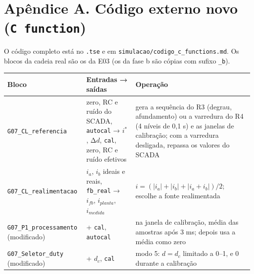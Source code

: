 \documentclass[10pt,a4paper]{article}
\begin{document}
\appendix
\section*{Apêndice A. Código externo novo (\texttt{C function})}
O código completo está no \texttt{.tse} e em \texttt{simulacao/codigo\_c\_functions.md}. Os blocos da cadeia real são os da E03 (os da fase b são cópias com sufixo \texttt{\_b}).
\begin{table}[!htbp]\centering\footnotesize
\begin{tabularx}{\textwidth}{p{3.6cm}p{3.0cm}Y}\toprule
Bloco & Entradas → saídas & Operação\\\midrule
\texttt{G07\_CL\_referencia} & zero, RC e ruído do SCADA, \texttt{autocal} → $i^*$, Δ$d$, \texttt{cal}, zero, RC e ruído efetivos & gera a sequência do R3 (degrau, afundamento) ou a varredura do R4 (4 níveis de 0,1 s) e as janelas de calibração; com a varredura desligada, repassa os valores do SCADA\\
\texttt{G07\_CL\_realimentacao} & $i_a$, $i_b$ ideais e reais, \texttt{fb\_real} → $i_{fb}$, $i_{planta}$, $i_{medida}$ & $i = (|i_a|+|i_b|+|i_a+i_b|)/2$; escolhe a fonte realimentada\\
\texttt{G07\_P1\_processamento} (modificado) & + \texttt{cal}, \texttt{autocal} & na janela de calibração, média das amostras após 3 ms; depois usa a média como zero\\
\texttt{G07\_Seletor\_duty} (modificado) & + $d_c$, \texttt{cal} & modo 5: $d = d_c$ limitado a 0–1, e 0 durante a calibração\\\bottomrule
\end{tabularx}
\end{table}
\end{document}
